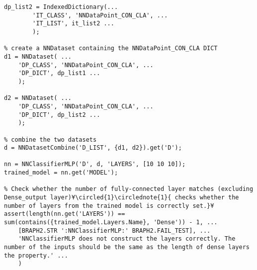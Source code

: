 \documentclass{tufte-handout}
\begin{document}
\begin{lstlisting}
dp_list2 = IndexedDictionary(...
        'IT_CLASS', 'NNDataPoint_CON_CLA', ...
        'IT_LIST', it_list2 ...
        );

% create a NNDataset containing the NNDataPoint_CON_CLA DICT
d1 = NNDataset( ...
    'DP_CLASS', 'NNDataPoint_CON_CLA', ...
    'DP_DICT', dp_list1 ...
    );

d2 = NNDataset( ...
    'DP_CLASS', 'NNDataPoint_CON_CLA', ...
    'DP_DICT', dp_list2 ...
    );

% combine the two datasets
d = NNDatasetCombine('D_LIST', {d1, d2}).get('D');

nn = NNClassifierMLP('D', d, 'LAYERS', [10 10 10]);
trained_model = nn.get('MODEL');

% Check whether the number of fully-connected layer matches (excluding Dense_output layer)¥\circled{1}\circlednote{1}{ checks whether the number of layers from the trained model is correctly set.}¥
assert(length(nn.get('LAYERS')) == sum(contains({trained_model.Layers.Name}, 'Dense')) - 1, ...
    [BRAPH2.STR ':NNClassifierMLP:' BRAPH2.FAIL_TEST], ...
    'NNClassifierMLP does not construct the layers correctly. The number of the inputs should be the same as the length of dense layers the property.' ...
    )

\end{lstlisting}

%
%
\end{document}
